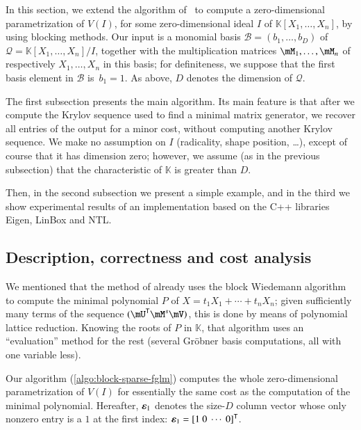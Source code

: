 \documentclass[final,1p,times,authoryear]{elsarticle}
\newcommand{\col}[1]{\bm{\MakeLowercase{#1}}} %
\newcommand{\basis}{\mathscr{B}}
\newcommand{\minpoly}{P}
\newcommand{\lf}{X}
\newcommand{\residueI}{\mathscr{Q}}
\newcommand{\trsp}[1]{#1^{\mathsf{T}}} %
\def\K{\mathbb{K}}
\def\K {\ensuremath{\mathbb{K}}}
\newcommand{\mUt}{\trsp{\mU}}
\begin{document}
In this section, we extend the algorithm of~\citep{BoSaSc03} to compute
a zero-dimensional parametrization of $V(I)$, for some
zero-dimensional ideal $I$ of $\K[X_1,\dots,X_n]$, by using blocking
methods. Our input is a monomial basis
$\basis=(b_1,\dots,b_D)$ of $\residueI=\K[X_1,\dots,X_n]/I$, together
with the multiplication matrices $\mM_1,\dots,\mM_n$ of respectively
$X_1,\dots,X_n$ in this basis; for definiteness, we suppose that the
first basis element in $\basis$ is~$b_1=1$. As above, $D$ denotes the
dimension of $\residueI$.

The first subsection presents the main algorithm. Its main feature is
that after we compute the Krylov sequence used to find a minimal
matrix generator, we recover all entries of the output for a minor
cost, without computing another Krylov sequence. We make no assumption
on $I$ (radicality, shape position, \dots), except of course that it
has dimension zero; however, we assume (as in the previous subsection)
that the characteristic of $\K$ is greater than $D$. 

Then, in the second subsection we present a simple example, and in the third we
show experimental results of an implementation based on the C++ libraries
Eigen, LinBox and NTL.


\subsection{Description, correctness and cost analysis}\label{ssec:mainalgo}

We mentioned that the method of \citet{Steel15} already uses the block
Wiedemann algorithm to compute the minimal polynomial $\minpoly$ of
$\lf=t_1 X_1 + \cdots + t_n X_n$; {given sufficiently many terms of the
  sequence $(\mUt \mM^s \mV)$, this is done by means of polynomial
  lattice reduction}. Knowing the roots of $\minpoly$ in $\K$, that
algorithm uses an ``evaluation'' method for the rest (several
Gr\"obner basis computations, all with one variable less).

Our algorithm (\cref{algo:block-sparse-fglm}) computes the whole
zero-dimensional parametrization of $V(I)$ for essentially the same cost as the
computation of the minimal polynomial. Hereafter, $\col{\varepsilon}_1$
denotes the size-$D$ column vector whose only nonzero entry is a $1$ at the
first index: $\col{\varepsilon}_1 =\trsp{[1~0~\cdots~0]}$.
\end{document}
